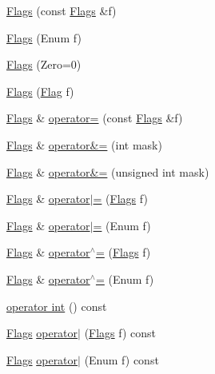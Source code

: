 \begin{DoxyCompactItemize}
\item 
\hyperlink{classprism_1_1_flags_ab702770c2483a4faaa20e5cb53a0cc1d}{Flags} (const \hyperlink{classprism_1_1_flags}{Flags} \&f)
\item 
\hyperlink{classprism_1_1_flags_acb2acd31ec112f36935e83f6b30fb2a2}{Flags} (Enum f)
\item 
\hyperlink{classprism_1_1_flags_a4a4b320bab3416ec612e3d7fb8d5bc9f}{Flags} (Zero=0)
\item 
\hyperlink{classprism_1_1_flags_ad84d23a80b3d05f919c5173716aee953}{Flags} (\hyperlink{classprism_1_1_flag}{Flag} f)
\item 
\hyperlink{classprism_1_1_flags}{Flags} \& \hyperlink{classprism_1_1_flags_a417a716b1fe682f70a5f9d892f9f52ae}{operator=} (const \hyperlink{classprism_1_1_flags}{Flags} \&f)
\item 
\hyperlink{classprism_1_1_flags}{Flags} \& \hyperlink{classprism_1_1_flags_a0dce2c8d69f4070adb183fd4ecd32c72}{operator\&=} (int mask)
\item 
\hyperlink{classprism_1_1_flags}{Flags} \& \hyperlink{classprism_1_1_flags_a10e8d99b32cd66730fdf5c925df8d835}{operator\&=} (unsigned int mask)
\item 
\hyperlink{classprism_1_1_flags}{Flags} \& \hyperlink{classprism_1_1_flags_ae45501369741bec949c438e33abaa691}{operator$\vert$=} (\hyperlink{classprism_1_1_flags}{Flags} f)
\item 
\hyperlink{classprism_1_1_flags}{Flags} \& \hyperlink{classprism_1_1_flags_ac154dae287ae3200a19ccdd4236750ad}{operator$\vert$=} (Enum f)
\item 
\hyperlink{classprism_1_1_flags}{Flags} \& \hyperlink{classprism_1_1_flags_adbd2fc9df07db796dfe16e9cf1476110}{operator$^\wedge$=} (\hyperlink{classprism_1_1_flags}{Flags} f)
\item 
\hyperlink{classprism_1_1_flags}{Flags} \& \hyperlink{classprism_1_1_flags_ac5ace902a279edd8e5be31e4668f853a}{operator$^\wedge$=} (Enum f)
\item 
\hyperlink{classprism_1_1_flags_ad914643c0ea6304a14e738970946b146}{operator int} () const 
\item 
\hyperlink{classprism_1_1_flags}{Flags} \hyperlink{classprism_1_1_flags_a69ec60ebffd8888278650c1eb6def089}{operator$\vert$} (\hyperlink{classprism_1_1_flags}{Flags} f) const 
\item 
\hyperlink{classprism_1_1_flags}{Flags} \hyperlink{classprism_1_1_flags_a1fbd3c6ffce171e8ed6ec1dab4691c71}{operator$\vert$} (Enum f) const 

\end{DoxyCompactItemize}
